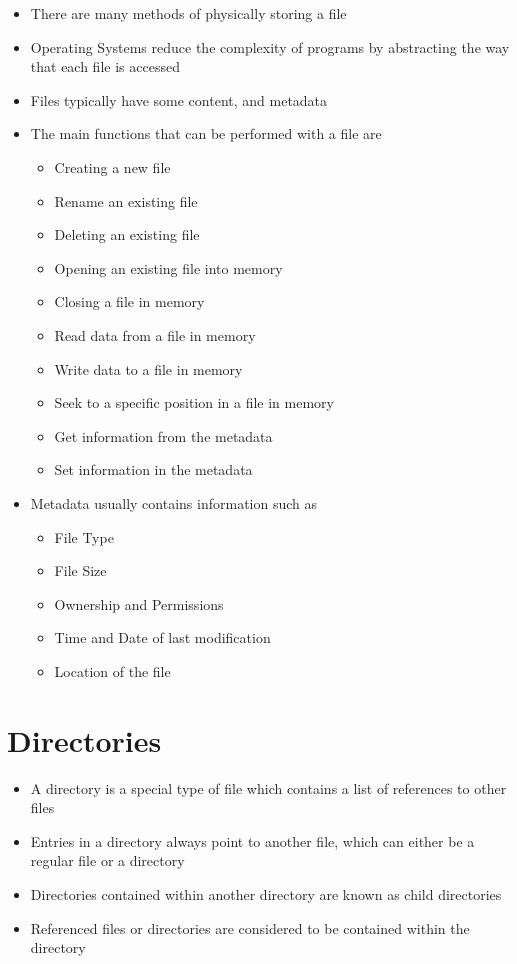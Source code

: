 
\begin{itemize}
  \item There are many methods of physically storing a file
  \item Operating Systems reduce the complexity of programs by abstracting the way that each file is accessed
  \item Files typically have some content, and metadata
  \item The main functions that can be performed with a file are
  \begin{itemize}
    \item Creating a new file
    \item Rename an existing file
    \item Deleting an existing file
    \item Opening an existing file into memory
    \item Closing a file in memory
    \item Read data from a file in memory
    \item Write data to a file in memory
    \item Seek to a specific position in a file in memory
    \item Get information from the metadata
    \item Set information in the metadata
  \end{itemize}
  \item Metadata usually contains information such as 
  \begin{itemize}
    \item File Type
    \item File Size
    \item Ownership and Permissions
    \item Time and Date of last modification
    \item Location of the file
  \end{itemize}
\end{itemize}

\section*{Directories}

\begin{itemize}
  \item A directory is a special type of file which contains a list of references to other files
  \item Entries in a directory always point to another file, which can either be a regular file or a directory
  \item Directories contained within another directory are known as child directories
  \item Referenced files or directories are considered to be contained within the directory
\end{itemize}


